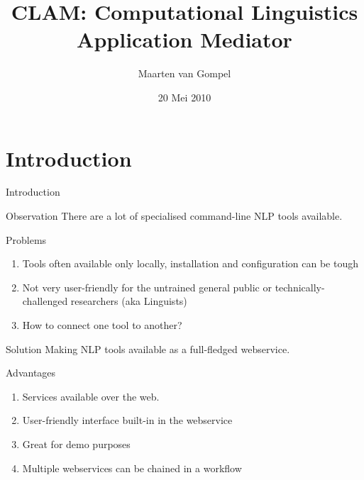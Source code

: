 \documentclass[compress]{beamer}
\title{CLAM: Computational Linguistics Application Mediator}
\author{Maarten van Gompel}
\date{20 Mei 2010}
\begin{document}
\begin{frame}
	\titlepage\smallraccoon\ilkuvt
\end{frame}

\section{Introduction}

\begin{frame}{Introduction}

    \begin{block}{Observation}
        There are a lot of specialised command-line NLP tools available.
    \end{block}

    \begin{block}{Problems}
        \begin{enumerate}
            \item Tools often available only locally, installation and configuration can be tough
            \item Not very user-friendly for the untrained general public or technically-challenged researchers (aka Linguists)
            \item How to connect one tool to another?
        \end{enumerate}
    \end{block}
\end{frame}

\begin{frame}
    \begin{block}{Solution} 
        Making NLP tools available as a full-fledged webservice.
    \end{block}

    \begin{block}{Advantages}

        \begin{enumerate}
            \item Services available over the web.
            \item User-friendly interface built-in in the webservice
            \item Great for demo purposes
            \item Multiple webservices can be chained in a workflow
        \end{enumerate}

    \end{block}
\end{frame}
\end{document}

